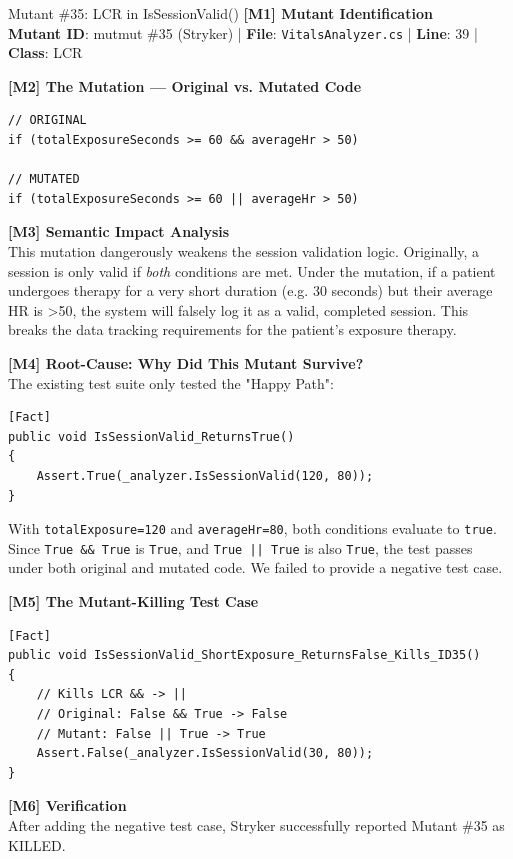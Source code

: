 \documentclass[11pt,a4paper]{article}
\begin{document}
\vspace{0.5cm}

\begin{mutantbox}{Mutant \#35: LCR in IsSessionValid()}
\textbf{[M1] Mutant Identification}\\
\textbf{Mutant ID}: mutmut \#35 (Stryker) | \textbf{File}: \texttt{VitalsAnalyzer.cs} | \textbf{Line}: 39 | \textbf{Class}: LCR

\vspace{0.3cm}
\textbf{[M2] The Mutation — Original vs. Mutated Code}
\begin{lstlisting}[style=csharp]
// ORIGINAL
if (totalExposureSeconds >= 60 && averageHr > 50)

// MUTATED
if (totalExposureSeconds >= 60 || averageHr > 50)
\end{lstlisting}

\textbf{[M3] Semantic Impact Analysis}\\
This mutation dangerously weakens the session validation logic. Originally, a session is only valid if \textit{both} conditions are met. Under the mutation, if a patient undergoes therapy for a very short duration (e.g. 30 seconds) but their average HR is >50, the system will falsely log it as a valid, completed session. This breaks the data tracking requirements for the patient's exposure therapy.

\vspace{0.3cm}
\textbf{[M4] Root-Cause: Why Did This Mutant Survive?}\\
The existing test suite only tested the "Happy Path":
\begin{lstlisting}[style=csharp]
[Fact]
public void IsSessionValid_ReturnsTrue()
{
    Assert.True(_analyzer.IsSessionValid(120, 80));
}
\end{lstlisting}
With \texttt{totalExposure=120} and \texttt{averageHr=80}, both conditions evaluate to \texttt{true}. Since \texttt{True \&\& True} is \texttt{True}, and \texttt{True || True} is also \texttt{True}, the test passes under both original and mutated code. We failed to provide a negative test case.

\vspace{0.3cm}
\textbf{[M5] The Mutant-Killing Test Case}
\begin{lstlisting}[style=csharp]
[Fact]
public void IsSessionValid_ShortExposure_ReturnsFalse_Kills_ID35()
{
    // Kills LCR && -> ||
    // Original: False && True -> False
    // Mutant: False || True -> True
    Assert.False(_analyzer.IsSessionValid(30, 80));
}
\end{lstlisting}

\textbf{[M6] Verification}\\
After adding the negative test case, Stryker successfully reported Mutant \#35 as KILLED.
\end{mutantbox}
\end{document}
